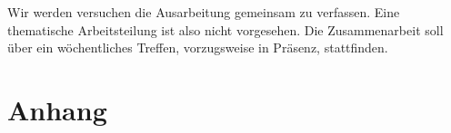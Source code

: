 \documentclass[11pt,a4paper]{article}
\begin{document}
Wir werden versuchen die Ausarbeitung gemeinsam zu verfassen.
Eine thematische Arbeitsteilung ist also nicht vorgesehen.
Die Zusammenarbeit soll über ein wöchentliches Treffen, vorzugsweise in Präsenz, stattfinden.

\appendix
\section{Anhang}


% 

\end{document}
